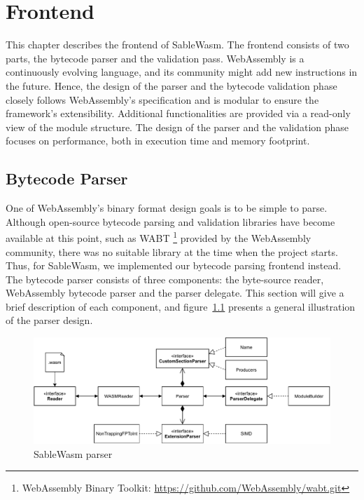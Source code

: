 \chapter{Frontend}
\label{chapter:frontend}

This chapter describes the frontend of SableWasm. The frontend consists of two
parts, the bytecode parser and the validation pass. WebAssembly is a
continuously evolving language, and its community might add new instructions in
the future. Hence, the design of the parser and the bytecode validation phase
closely follows WebAssembly's specification and is modular to ensure the
framework's extensibility. Additional functionalities are provided via a
read-only view of the module structure. The design of the parser and the
validation phase focuses on performance, both in execution time and memory
footprint.

\section{Bytecode Parser}

One of WebAssembly's binary format design goals is to be simple to parse.
Although open-source bytecode parsing and validation libraries have become
available at this point, such as WABT \footnote{WebAssembly Binary Toolkit:
  \url{https://github.com/WebAssembly/wabt.git}} provided by the WebAssembly
community, there was no suitable library at the time when the project starts.
Thus, for SableWasm, we implemented our bytecode parsing frontend instead. The
bytecode parser consists of three components: the byte-source reader,
WebAssembly bytecode parser and the parser delegate. This section will give a
brief description of each component, and figure~\ref{fig:sablewasm-parser}
presents a general illustration of the parser design.

\begin{figure}
  \centering
  \includegraphics[width=\textwidth]{Images/sablewasm-parser.pdf}
  \caption{SableWasm parser}
  \label{fig:sablewasm-parser}
\end{figure}

